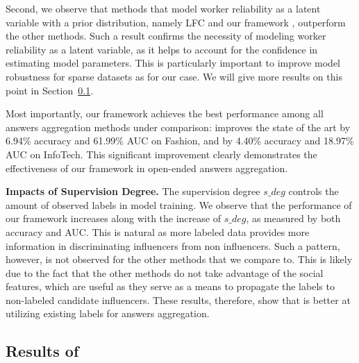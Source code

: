 Second, we observe that methods that model worker reliability as a latent variable with a prior distribution, namely LFC and our framework \sys, outperform the other methods. Such a result confirms the necessity of modeling worker reliability as a latent variable, as it helps to account for the confidence in estimating model parameters. This is particularly important to improve model robustness for sparse datasets as for our case. We  will give more results on this point in Section~\ref{sec:selfres}.

Most importantly, our framework \sys achieves the best performance among all answers aggregation methods under comparison: \sys improves the state of the art by 6.94\% accuracy and 61.99\% AUC on Fashion, and by 4.40\% accuracy and 18.97\% AUC on InfoTech. This significant improvement clearly demonstrates the effectiveness of our framework in open-ended answers aggregation. 



\smallskip
\noindent\textbf{Impacts of Supervision Degree.} The supervision degree $s\_deg$ controls the amount of observed labels in model training. We observe that the performance of our framework increases along with the increase of $s\_deg$, as measured by both accuracy and AUC. This is natural as more labeled data provides more information in discriminating influencers from non influencers. Such a pattern, however, is not observed for the other methods that we compare to. This is likely due to the fact that the other methods do not take advantage of the social features, which are useful as they serve as a means to propagate the labels to non-labeled candidate influencers. These results, therefore, show that \sys is better at utilizing existing labels for answers aggregation. 

\subsection{Results of \sys}
\label{sec:selfres}

